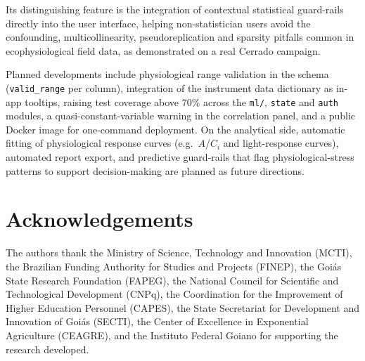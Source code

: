 \documentclass[preprint,12pt,a4paper]{elsarticle}
\begin{document}
Its distinguishing feature is the integration of contextual statistical guard-rails directly into the user interface, helping non-statistician users avoid the confounding, multicollinearity, pseudoreplication and sparsity pitfalls common in ecophysiological field data, as demonstrated on a real Cerrado campaign.

Planned developments include physiological range validation in the schema (\texttt{valid\_range} per column), integration of the instrument data dictionary as in-app tooltips, raising test coverage above 70\% across the \texttt{ml/}, \texttt{state} and \texttt{auth} modules, a quasi-constant-variable warning in the correlation panel, and a public Docker image for one-command deployment. On the analytical side, automatic fitting of physiological response curves (e.g.\ $A$/$C_i$ and light-response curves), automated report export, and predictive guard-rails that flag physiological-stress patterns to support decision-making are planned as future directions.

\section*{Acknowledgements}

The authors thank the Ministry of Science, Technology and Innovation (MCTI), the Brazilian Funding Authority for Studies and Projects (FINEP), the Goi\'as State Research Foundation (FAPEG), the National Council for Scientific and Technological Development (CNPq), the Coordination for the Improvement of Higher Education Personnel (CAPES), the State Secretariat for Development and Innovation of Goi\'as (SECTI), the Center of Excellence in Exponential Agriculture (CEAGRE), and the Instituto Federal Goiano for supporting the research developed.



\end{document}
